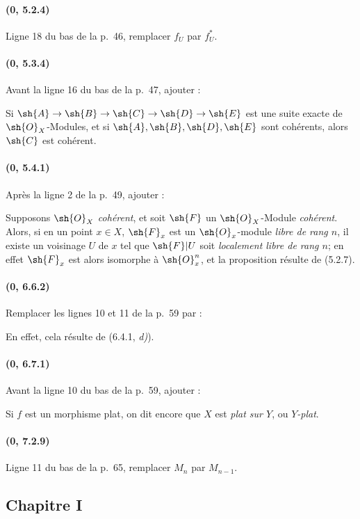 \paragraph{(0, 5.2.4)}
Ligne 18 du bas de la p.~46, remplacer $f_U$ par $f_U^*$.

\paragraph{(0, 5.3.4)}
Avant la ligne 16 du bas de la p.~47, ajouter :

Si $\sh{A}\to\sh{B}\to\sh{C}\to\sh{D}\to\sh{E}$
est une suite exacte de $\sh{O}_X$-Modules, et si
$\sh{A},\sh{B},\sh{D},\sh{E}$ sont cohérents, alors $\sh{C}$ est
cohérent.

\paragraph{(0, 5.4.1)}
Après la ligne 2 de la p.~49, ajouter :

Supposons $\sh{O}_X$ \emph{cohérent}, et soit $\sh{F}$ un $\sh{O}_X$-Module
\emph{cohérent}. Alors, si en un point $x\in X$, $\sh{F}_x$ est un
$\sh{O}_x$-module \emph{libre de rang $n$}, il existe un voisinage $U$ de $x$
tel que $\sh{F}|U$ soit \emph{localement libre de rang $n$}; en effet
$\sh{F}_x$ est alors isomorphe à $\sh{O}_x^n$, et la proposition résulte
de (5.2.7).

\paragraph{(0, 6.6.2)}
Remplacer les lignes 10 et 11 de la p.~59 par :

En effet, cela résulte de (6.4.1, \emph{d)}).

\paragraph{(0, 6.7.1)}
Avant la ligne 10 du bas de la p.~59, ajouter :

Si $f$ est un morphisme plat, on dit encore que $X$ est \emph{plat sur
$Y$}, ou \emph{$Y$-plat}.

\paragraph{(0, 7.2.9)}
Ligne 11 du bas de la p.~65, remplacer $M_n$ par $M_{n-1}$.

\subsection*{Chapitre I}

